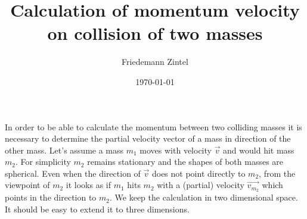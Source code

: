 \documentclass[a4paper]{article}
\title{Calculation of momentum velocity on collision of two masses}
\author{Friedemann Zintel}
\date{\today}
\begin{document}
\maketitle

In order to be able to calculate the momentum between two colliding masses it is necessary to determine the partial velocity vector of a mass in direction of the other mass.
Let's assume a mass $m_1$ moves with velocity $\vec{v}$ and would hit mass $m_2$. For simplicity $m_2$ remains stationary and the shapes of both masses are spherical.
Even when the direction of $\vec{v}$ does not point directly to $m_2$, from the viewpoint
of $m_2$ it looks as if $m_1$ hits $m_2$ with a (partial) velocity $\vec{v_{m_2}}$ which points in the direction to $m_2$. We keep the calculation in two dimensional space.
It should be easy to extend it to three dimensions.
\end{document}

